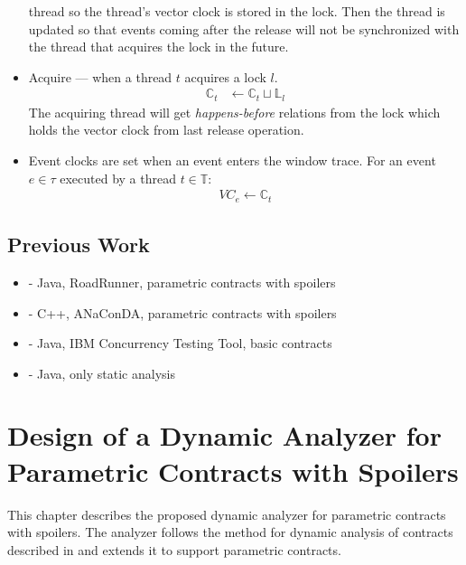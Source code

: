 \begin{itemize}
        thread so the thread's vector clock is stored in the lock. Then the
        thread is updated so that events coming after the release will not be
        synchronized with the thread that acquires the lock in the future.
    \item Acquire --- when a thread $t$ acquires a lock $l$.
        \begin{align*}
            \mathbb{C}_t &\leftarrow \mathbb{C}_t \sqcup \mathbb{L}_l
        \end{align*}
        The acquiring thread will get \emph{happens-before} relations from the
        lock which holds the vector clock from last release operation.
    \item Event clocks are set when an event enters the window trace. For an
        event $e \in \tau$ executed by a thread $t \in \mathbb{T}$:
        \begin{align*}
            VC_e \leftarrow \mathbb{C}_t
        \end{align*}
\end{itemize}


\section{Previous Work}


\begin{itemize}
    \item \cite{janousek} - Java, RoadRunner, parametric contracts with spoilers
    \item \cite{contracts} - C++, ANaConDA, parametric contracts with spoilers
    \item \cite{FITPUB10817} - Java, IBM Concurrency Testing Tool, basic
        contracts
    \item \cite{DBLP:journals/corr/SousaDFL15} - Java, only static analysis
\end{itemize}



\chapter{Design of a Dynamic Analyzer for Parametric Contracts with Spoilers}
\label{chFour}

This chapter describes the proposed dynamic analyzer for parametric contracts
with spoilers. The analyzer follows the method for dynamic analysis of contracts
described in \cite{contracts} and extends it to support parametric contracts.

